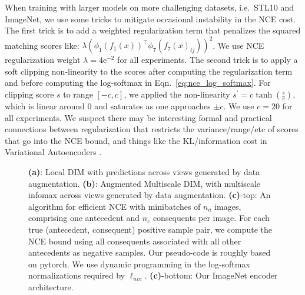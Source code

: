 \documentclass{article}
\begin{document}
When training with larger models on more challenging datasets, i.e.~STL10 and ImageNet, we use some tricks to mitigate occasional instability in the NCE cost.
The first trick is to add a weighted regularization term that penalizes the squared matching scores like: $\lambda (\phi_1(f_1(x))^{\top} \phi_7(f_7(x)_{ij}))^2$.
We use NCE regularization weight $\lambda = 4\mbox{e}^{-2}$ for all experiments.
The second trick is to apply a soft clipping non-linearity to the scores after computing the regularization term and before computing the log-softmax in Eqn.~\ref{eq:nce_log_softmax}.
For clipping score $s$ to range $[-c, c]$, we applied the non-linearity $s^{\prime} = c \tanh(\frac{s}{c})$, which is linear around 0 and saturates as one approaches $\pm c$. We use $c = 20$ for all experiments. We suspect there may be interesting formal and practical connections between regularization that restricts the variance/range/etc of scores that go into the NCE bound, and things like the KL/information cost in Variational Autoencoders \citep{kingma2013auto}.

\begin{figure*}[t!]
    \centering
    \quad
    \quad
    \caption{\textbf{(a)}: Local DIM with predictions across views generated by data augmentation. \textbf{(b)}: Augmented Multiscale DIM, with multiscale infomax across views generated by data augmentation. \textbf{(c)}-top: An algorithm for efficient NCE with minibatches of $n_a$ images, comprising one antecedent and $n_c$ consequents per image. For each true (antecedent, consequent) positive sample pair, we compute the NCE bound using all consequents associated with all other antecedents as negative samples. Our pseudo-code is roughly based on pytorch. We use dynamic programming in the log-softmax normalizations required by $\ell_{nce}$. \textbf{(c)}-bottom: Our ImageNet encoder architecture.}
    \label{fig:model_info}
    \vspace{-0.5cm}
\end{figure*}
\end{document}
